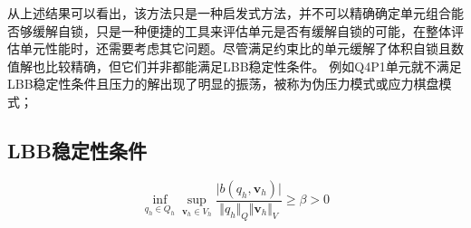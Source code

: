 从上述结果可以看出，该方法只是一种启发式方法，并不可以精确确定单元组合能否够缓解自锁，只是一种便捷的工具来评估单元是否有缓解自锁的可能，在整体评估单元性能时，还需要考虑其它问题。尽管满足约束比的单元缓解了体积自锁且数值解也比较精确，但它们并非都能满足LBB稳定性条件。
例如Q4P1单元就不满足LBB稳定性条件且压力的解出现了明显的振荡，被称为伪压力模式或应力棋盘模式；
\subsection{LBB稳定性条件}
\begin{equation}\label{infsup}
    \inf_{q_h \in Q_h} \sup_{\boldsymbol v_h \in V_h} \frac{\vert b(q_h,\boldsymbol v_h) \vert}{\Vert q_h \Vert_Q \Vert \boldsymbol v_h \Vert_V} \ge \beta > 0
\end{equation}
